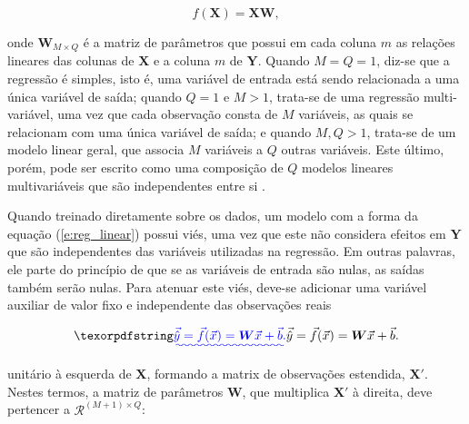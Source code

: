     \begin{equation} \label{e:reg_linear}
      f(\boldsymbol{X}) = \boldsymbol{X} \boldsymbol{W}
      ,
    \end{equation}

    \noindent onde $\boldsymbol{W}_{M\times Q}$ é a matriz de parâmetros que possui em cada coluna $m$ as relações lineares das colunas de $\boldsymbol{X}$ e a coluna $m$ de $\boldsymbol{Y}$. Quando $M=Q=1$, diz-se que a regressão é simples, isto é, uma variável de entrada está sendo relacionada a uma única variável de saída; quando $Q = 1$ e $M > 1$, trata-se de uma regressão multi-variável, uma vez que cada observação consta de $M$ variáveis, as quais se relacionam com uma única variável de saída; e quando $M,Q>1$, trata-se de um modelo linear geral, que associa $M$ variáveis a $Q$ outras variáveis. Este último, porém, pode ser escrito como uma composição de $Q$ modelos lineares multivariáveis que são independentes entre si .

    Quando treinado diretamente sobre os dados, um modelo com a forma da equação (\ref{e:reg_linear}) possui viés, uma vez que este não considera efeitos em $\boldsymbol{Y}$ que são independentes das variáveis utilizadas na regressão. Em outras palavras, ele parte do princípio de que se as variáveis de entrada são nulas, as saídas também serão nulas. Para atenuar este viés, deve-se adicionar uma variável auxiliar de valor fixo e independente das observações reais\DIFdelbegin {}\DIFdelend \DIFaddbegin {}

    \begin{equation} \DIFadd{\label{e:reg_linear_amostra_b}
      \vec{\hat{y}} = \vec{f}(\vec{x}) = \boldsymbol{W} \vec{x} + \vec{b}
      .
    }\end{equation}


    \DIFaddend unitário \DIFdelbegin \DIFdel{, }\DIFdelend \DIFaddbegin {}\DIFaddend à esquerda de $\boldsymbol{X}$, formando a matrix de observações estendida, $\boldsymbol{X}'$. Nestes termos, a matriz de parâmetros $\boldsymbol{W}$, que multiplica $\boldsymbol{X}'$ à direita, deve pertencer a $\mathcal{R}^{(M+1) \times Q}$:

